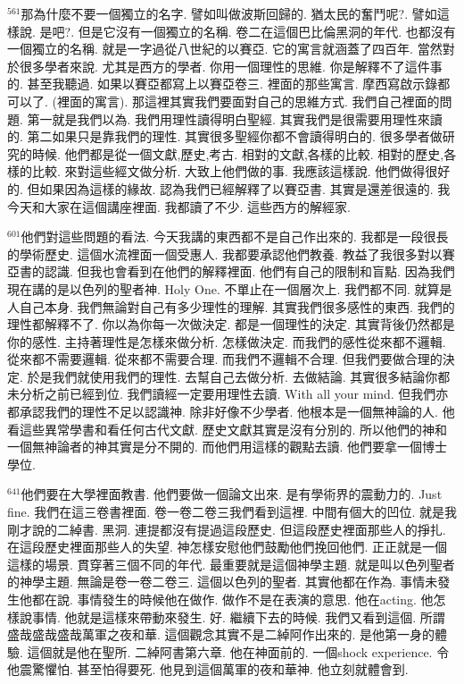 \documentclass{book}
\begin{document}
$^{561}$那為什麼不要一個獨立的名字.
譬如叫做波斯回歸的.
猶太民的奮鬥呢?.
譬如這樣說.
是吧?.
但是它沒有一個獨立的名稱.
卷二在這個巴比倫黑洞的年代.
也都沒有一個獨立的名稱.
就是一字過從八世紀的以賽亞.
它的寓言就涵蓋了四百年.
當然對於很多學者來說.
尤其是西方的學者.
你用一個理性的思維.
你是解釋不了這件事的.
甚至我聽過.
如果以賽亞都寫上以賽亞卷三.
裡面的那些寓言.
摩西寫啟示錄都可以了.
(裡面的寓言).
那這裡其實我們要面對自己的思維方式.
我們自己裡面的問題.
第一就是我們以為.
我們用理性讀得明白聖經.
其實我們是很需要用理性來讀的.
第二如果只是靠我們的理性.
其實很多聖經你都不會讀得明白的.
很多學者做研究的時候.
他們都是從一個文獻,歷史,考古.
相對的文獻,各樣的比較.
相對的歷史,各樣的比較.
來對這些經文做分析.
大致上他們做的事.
我應該這樣說.
他們做得很好的.
但如果因為這樣的緣故.
認為我們已經解釋了以賽亞書.
其實是還差很遠的.
我今天和大家在這個講座裡面.
我都讀了不少.
這些西方的解經家.

$^{601}$他們對這些問題的看法.
今天我講的東西都不是自己作出來的.
我都是一段很長的學術歷史.
這個水流裡面一個受惠人.
我都要承認他們教養.
教益了我很多對以賽亞書的認識.
但我也會看到在他們的解釋裡面.
他們有自己的限制和盲點.
因為我們現在講的是以色列的聖者神.
Holy One.
不單止在一個層次上.
我們都不同.
就算是人自己本身.
我們無論對自己有多少理性的理解.
其實我們很多感性的東西.
我們的理性都解釋不了.
你以為你每一次做決定.
都是一個理性的決定.
其實背後仍然都是你的感性.
主持著理性是怎樣來做分析.
怎樣做決定.
而我們的感性從來都不邏輯.
從來都不需要邏輯.
從來都不需要合理.
而我們不邏輯不合理.
但我們要做合理的決定.
於是我們就使用我們的理性.
去幫自己去做分析.
去做結論.
其實很多結論你都未分析之前已經到位.
我們讀經一定要用理性去讀.
With all your mind.
但我們亦都承認我們的理性不足以認識神.
除非好像不少學者.
他根本是一個無神論的人.
他看這些異常學書和看任何古代文獻.
歷史文獻其實是沒有分別的.
所以他們的神和一個無神論者的神其實是分不開的.
而他們用這樣的觀點去讀.
他們要拿一個博士學位.

$^{641}$他們要在大學裡面教書.
他們要做一個論文出來.
是有學術界的震動力的.
Just fine.
我們在這三卷書裡面.
卷一卷二卷三我們看到這裡.
中間有個大的凹位.
就是我剛才說的二綽書.
黑洞.
連提都沒有提過這段歷史.
但這段歷史裡面那些人的掙扎.
在這段歷史裡面那些人的失望.
神怎樣安慰他們鼓勵他們挽回他們.
正正就是一個這樣的場景.
貫穿著三個不同的年代.
最重要就是這個神學主題.
就是叫以色列聖者的神學主題.
無論是卷一卷二卷三.
這個以色列的聖者.
其實他都在作為.
事情未發生他都在說.
事情發生的時候他在做作.
做作不是在表演的意思.
他在acting.
他怎樣說事情.
他就是這樣來帶動來發生.
好.
繼續下去的時候.
我們又看到這個.
所謂盛哉盛哉盛哉萬軍之夜和華.
這個觀念其實不是二綽阿作出來的.
是他第一身的體驗.
這個就是他在聖所.
二綽阿書第六章.
他在神面前的.
一個shock experience.
令他震驚懼怕.
甚至怕得要死.
他見到這個萬軍的夜和華神.
他立刻就體會到.
\end{document}
